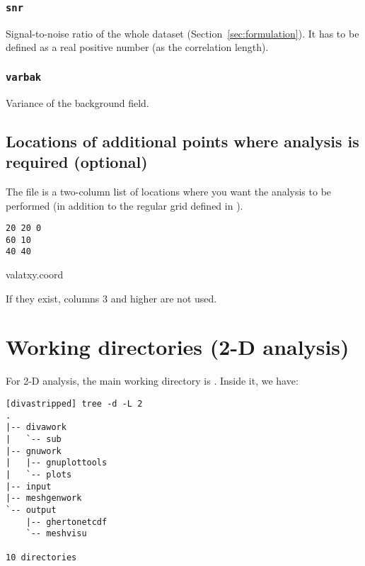 \subsubsection{\texttt{snr}}

Signal-to-noise ratio of the whole dataset (Section~\ref{sec:formulation}). It has to be defined as a real positive number (as the correlation length).

\subsubsection{\texttt{varbak}}

Variance of the background field. 

\subsection[Additional points of analysis]{Locations of additional points where analysis is required (optional)}

The file  is a two-column list of locations where you want the analysis to be performed (in addition to the regular grid defined in ).  

\begin{exfile}[htpb]
\begin{footnotesize}
\texttt{20 20 0\\
60 10\\
40 40} 
\end{footnotesize}
\caption{valatxy.coord\label{ex:valatxy}}
\end{exfile}

If they exist, columns 3 and higher are not used.


\section{Working directories (2-D analysis)}

For 2-D analysis, the main working directory is . Inside it, we have:
\begin{lstlisting}[style=Bash]
[divastripped] tree -d -L 2
.
|-- divawork
|   `-- sub
|-- gnuwork
|   |-- gnuplottools
|   `-- plots
|-- input
|-- meshgenwork
`-- output
    |-- ghertonetcdf
    `-- meshvisu

10 directories
\end{lstlisting}


